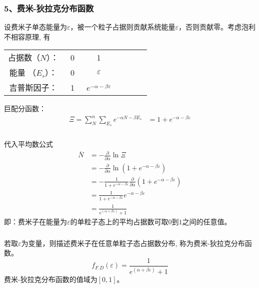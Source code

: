\begin{frame}
  \frametitle{5、费米-狄拉克分布函数}
  \解 设费米子单态能量为$\varepsilon$，被一个粒子占据则贡献系统能量$\varepsilon$，否则贡献零。考虑泡利不相容原理, 有
\begin{table}[htbp]
  \centering\begin{tabular}{ccccccc}
    占据数（$N$）： & ~0~ & ~1~ \\
    能量 （$E_s$）： &  0 & $\varepsilon$\\
    吉普斯因子： & 1 & $e^{-\alpha -\beta \varepsilon }$ 
  \end{tabular}
\end{table}
巨配分函数：$$ 
\begin{aligned}
  \Xi = \sum_{N} ^n \sum_{E_s} e^{-\alpha N -\beta E_s}  
  &= 1+ e^{-\alpha -\beta \varepsilon }
\end{aligned}
$$ 
\end{frame} 

\begin{frame}
  \frametitle{}
代入平均数公式
\[
\begin{aligned}
\overline{N} &= - \frac{\partial }{\partial \alpha } \ln \Xi \\
&= - \frac{\partial }{\partial \alpha } \ln (1+ e^{-\alpha -\beta \varepsilon }) \\
&= - \frac{1}{1+ e^{-\alpha -\beta \varepsilon }}\frac{\partial }{\partial \alpha } (1+ e^{-\alpha -\beta \varepsilon }) \\
&= \frac{1}{1+ e^{-\alpha -\beta \varepsilon }}e^{-\alpha -\beta \varepsilon } \\
&= \frac{1}{e^{(\alpha +\beta \varepsilon)}+1}
\end{aligned} 
  \]
即：费米子在能量为$\varepsilon$的单粒子态上的平均占据数可取$0$到$1$之间的任意值。
\end{frame} 

\begin{frame}
  \frametitle{}
若取$\varepsilon$为变量，则描述费米子在任意单粒子态占据数分布, 称为费米-狄拉克分布函数。
\[ \boxed{f_{F.D}(\varepsilon) =  \frac{1}{e^{(\alpha +\beta \varepsilon)}+1}}\]
费米-狄拉克分布函数的值域为$[0,1]$。
\end{frame} 

